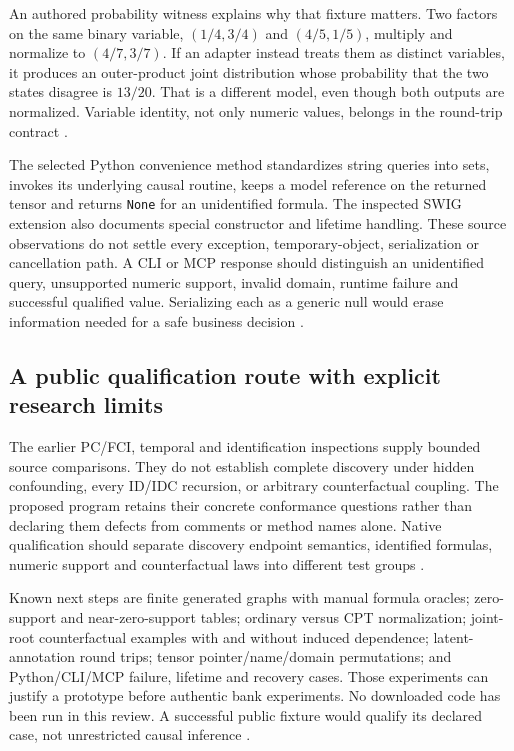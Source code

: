 An authored probability witness explains why that fixture matters. Two
factors on the same binary variable, $(1/4,3/4)$ and $(4/5,1/5)$, multiply
and normalize to $(4/7,3/7)$. If an adapter instead treats them as distinct
variables, it produces an outer-product joint distribution whose
probability that the two states disagree is $13/20$. That is a different
model, even though both outputs are normalized. Variable identity, not only
numeric values, belongs in the round-trip contract
\cite{exec24_agrum_choice}.

The selected Python convenience method standardizes string queries into
sets, invokes its underlying causal routine, keeps a model reference on the
returned tensor and returns \texttt{None} for an unidentified formula.
The inspected SWIG extension also documents special constructor and lifetime
handling. These source observations do not settle every exception,
temporary-object, serialization or cancellation path. A CLI or MCP response
should distinguish an unidentified query, unsupported numeric support,
invalid domain, runtime failure and successful qualified value. Serializing
each as a generic null would erase information needed for a safe business
decision \cite{exec24_agrum_source,exec24_agrum_choice}.

\subsection{A public qualification route with explicit research limits}
The earlier PC/FCI, temporal and identification inspections supply bounded
source comparisons. They do not establish complete discovery under hidden
confounding, every ID/IDC recursion, or arbitrary counterfactual coupling.
The proposed program retains their concrete conformance questions rather
than declaring them defects from comments or method names alone. Native
qualification should separate discovery endpoint semantics, identified
formulas, numeric support and counterfactual laws into different test groups
\cite{exec13_cxx_agrum,exec14_native_agrum,exec16_ct_agrum,
exec19_cxx_identification_source,exec24_agrum_choice}.

Known next steps are finite generated graphs with manual formula oracles;
zero-support and near-zero-support tables; ordinary versus CPT normalization;
joint-root counterfactual examples with and without induced dependence;
latent-annotation round trips; tensor pointer/name/domain permutations;
and Python/CLI/MCP failure, lifetime and recovery cases. Those experiments
can justify a prototype before authentic bank experiments. No downloaded
code has been run in this review. A successful public fixture would qualify
its declared case, not unrestricted causal inference
\cite{exec24_agrum_choice}.

